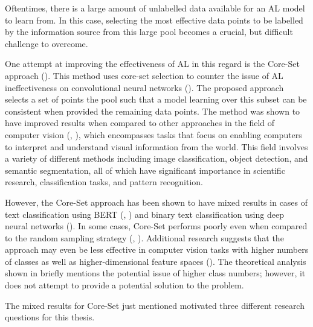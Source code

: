\documentclass[english,bachelor,ul]{webisthesis} %
\begin{document}
Oftentimes, there is a large amount of unlabelled data available for an AL model to learn from. In this case, selecting the most effective data points to be labelled by the information source from this large pool becomes a crucial, but difficult challenge to overcome. 

One attempt at improving the effectiveness of AL in this regard is the Core-Set approach (\cite{DBLP:conf/iclr/SenerS18}). This method uses core-set selection to counter the issue of AL ineffectiveness on convolutional neural networks (\cite{DBLP:conf/iclr/SenerS18}). The proposed approach selects a set of points the pool such that a model learning over this subset can be consistent when provided the remaining data points. The method was shown to have improved results when compared to other approaches in the field of computer vision (\cite{DBLP:conf/iclr/SenerS18}, \cite{DBLP:conf/cvpr/CaramalauBK21}), which encompasses tasks that focus on enabling computers to interpret and understand visual information from the world. This field involves a variety of different methods including image classification, object detection, and semantic segmentation, all of which have significant importance in scientific research, classification tasks, and pattern recognition.

However, the Core-Set approach has been shown to have mixed results in cases of text classification using BERT (\cite{DBLP:conf/kdd/0002MM21}, \cite{DBLP:conf/emnlp/Ein-DorHGSDCDAK20}) and binary text classification using deep neural networks (\cite{DBLP:conf/cikm/Liu0LZW21}). In some cases, Core-Set performs poorly even when compared to the random sampling strategy (\cite{DBLP:conf/kdd/0002MM21}, \cite{DBLP:conf/aaai/ColemanCKCBBNSZ22}). Additional research suggests that the approach may even be less effective in computer vision tasks with higher numbers of classes as well as higher-dimensional feature spaces (\cite{DBLP:conf/iccv/SinhaED19}). The theoretical analysis shown in \cite{DBLP:conf/iclr/SenerS18} briefly mentions the potential issue of higher class numbers; however, it does not attempt to provide a potential solution to the problem.

The mixed results for Core-Set just mentioned motivated three different research questions for this thesis.
\end{document}
